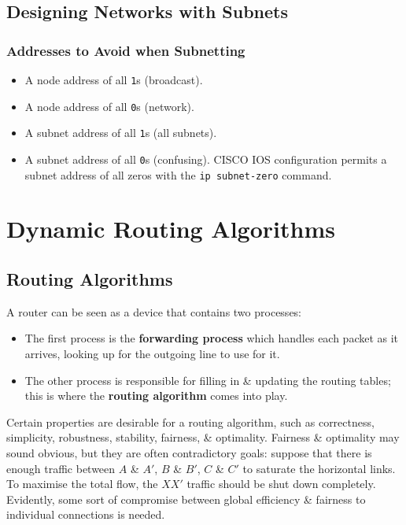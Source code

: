 \documentclass[a4paper,11pt]{article}
\begin{document}
\subsection{Designing Networks with Subnets}
\subsubsection{Addresses to Avoid when Subnetting}
\begin{itemize}
    \item   A node address of all \verb|1|s (broadcast).
    \item   A node address of all \verb|0|s (network).
    \item   A subnet address of all \verb|1|s (all subnets).
    \item   A subnet address of all \verb|0|s (confusing).
            CISCO IOS configuration permits a subnet address of all zeros with the \verb|ip subnet-zero| command.
\end{itemize}

\section{Dynamic Routing Algorithms}
\subsection{Routing Algorithms}
A router can be seen as a device that contains two processes:
\begin{itemize}
    \item   The first process is the \textbf{forwarding process} which handles each packet as it arrives, 
            looking up for the outgoing  line to use for it.
    \item   The other process is responsible for filling in \& updating the routing tables; this is where the 
            \textbf{routing algorithm} comes into play.
\end{itemize}

Certain properties are desirable for a routing algorithm, such as correctness, simplicity, robustness, stability,
fairness, \& optimality.
Fairness \& optimality may sound obvious, but they are often contradictory goals:
suppose that there is enough traffic between $A$ \& $A'$, $B$ \& $B'$, $C$ \& $C'$ to saturate the horizontal 
links. 
To maximise the total flow, the $XX'$ traffic should be shut down completely.
Evidently, some sort of compromise between global efficiency \& fairness to individual connections is needed.
\end{document}
